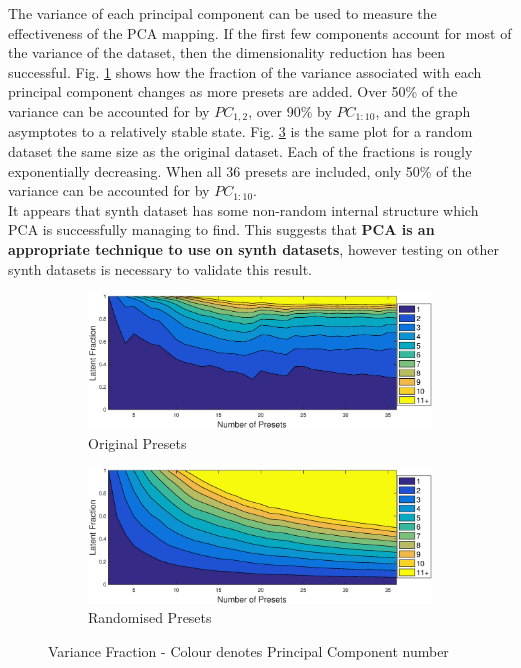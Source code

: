 \documentclass[11pt, oneside]{report}   	%
\begin{document}
The variance of each principal component can be used to measure the effectiveness of the PCA mapping. If the first few components account for most of the variance of the dataset, then the dimensionality reduction has been successful.
Fig. \ref{fig:LatentOriginal} shows how the fraction of the variance associated with each principal component changes as more presets are added. Over 50\% of the variance can be accounted for by $PC_{1,2}$,  over 90\% by $PC_{1 : 10}$, and the graph asymptotes to a relatively stable state. Fig. \ref{fig:LatentRandom} is the same plot for a random dataset the same size as the original dataset. Each of the fractions is rougly exponentially decreasing. When all 36 presets are included, only 50\% of the variance can be accounted for by $PC_{1 : 10}$. \\
It appears that synth dataset has some non-random internal structure which PCA is successfully managing to find. This suggests that \textbf{PCA is an appropriate technique to use on synth datasets}, however testing on other synth datasets is necessary to validate this result.
\begin{figure}[h]
	\vspace{-5pt}
	\hspace{-40pt}
	\begin{subfigure}{3.5in}
		\includegraphics[trim = {0, 0.1cm, 0, 0.5cm}, clip, width = \textwidth]{LatentFraction.eps}
		\caption{Original Presets}
		\label{fig:LatentOriginal}
	\end{subfigure} 
%
	\begin{subfigure}{3.5in}
		\includegraphics[trim = {0, 0.1cm, 0, 0.5cm}, clip, width = \textwidth]{LatentFractionRandom.eps}
		\caption{Randomised Presets}
		\label{fig:LatentRandom}
	\end{subfigure}
	\caption{Variance Fraction - Colour denotes Principal Component number}
\end{figure}
\end{document}
